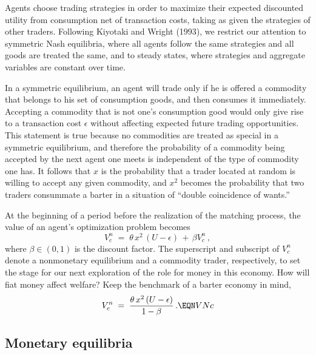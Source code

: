 Agents choose trading strategies in order to maximize their expected
discounted utility from consumption net of transaction costs, taking as
given the strategies of other traders. Following Kiyotaki and Wright
(1993), we restrict our attention to symmetric Nash equilibria, %
where all agents follow the same strategies and all goods are treated
the same, and to steady states, where strategies and aggregate variables
are constant over time.

In a symmetric equilibrium, an agent will  trade only if he is offered
a commodity that belongs to his set of consumption goods, and then
consumes it immediately. Accepting a commodity that is not one's consumption
good would only give rise to a transaction cost $\epsilon$ without
affecting expected future trading opportunities. This statement
is true because no commodities are treated as special in a
symmetric equilibrium, and therefore the probability of a commodity
being accepted by the next agent one meets is independent of the
type of commodity
one has.
It follows that $x$ is the probability that a trader located
at random is willing to accept any given commodity, and $x^2$ becomes
the probability that two traders consummate a barter in a situation
of ``double coincidence of wants.''

At the beginning of a period before the realization of the matching
process, the value of an agent's optimization problem becomes
$$
V^n_c \;=\; \theta\,x^2\,(U-\epsilon) \,+\, \beta V^n_c \,,
$$
where $\beta \in (0,1)$ is the discount factor. The superscript and
subscript of $V^n_c$ denote a nonmonetary equilibrium and a commodity
trader, respectively, to set the stage for our next exploration of the
role for money in this economy. How will fiat money affect welfare?
Keep the benchmark of a barter economy in mind,
$$
V^n_c \;=\; { \theta\,x^2\,(U-\epsilon) \over 1 - \beta }\,.   \EQN VNc
$$

\subsection{Monetary equilibria}

